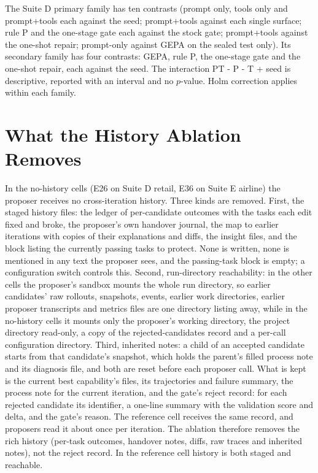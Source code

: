 The Suite D primary family has ten contrasts (prompt only, tools only and prompt+tools each against the seed; prompt+tools against each single surface; rule P and the one-stage gate each against the stock gate; prompt+tools against the one-shot repair; prompt-only against GEPA on the sealed test only). Its secondary family has four contrasts: GEPA, rule P, the one-stage gate and the one-shot repair, each against the seed. The interaction PT - P - T + seed is descriptive, reported with an interval and no $p$-value. Holm correction applies within each family.


\section{What the History Ablation Removes}
\label{app:history}

In the no-history cells (E26 on Suite D retail, E36 on Suite E airline) the proposer receives no cross-iteration history. Three kinds are removed. First, the staged history files: the ledger of per-candidate outcomes with the tasks each edit fixed and broke, the proposer's own handover journal, the map to earlier iterations with copies of their explanations and diffs, the insight files, and the block listing the currently passing tasks to protect. None is written, none is mentioned in any text the proposer sees, and the passing-task block is empty; a configuration switch controls this. Second, run-directory reachability: in the other cells the proposer's sandbox mounts the whole run directory, so earlier candidates' raw rollouts, snapshots, events, earlier work directories, earlier proposer transcripts and metrics files are one directory listing away, while in the no-history cells it mounts only the proposer's working directory, the project directory read-only, a copy of the rejected-candidates record and a per-call configuration directory. Third, inherited notes: a child of an accepted candidate starts from that candidate's snapshot, which holds the parent's filled process note and its diagnosis file, and both are reset before each proposer call. What is kept is the current best capability's files, its trajectories and failure summary, the process note for the current iteration, and the gate's reject record: for each rejected candidate its identifier, a one-line summary with the validation score and delta, and the gate's reason. The reference cell receives the same record, and proposers read it about once per iteration. The ablation therefore removes the rich history (per-task outcomes, handover notes, diffs, raw traces and inherited notes), not the reject record. In the reference cell history is both staged and reachable.

